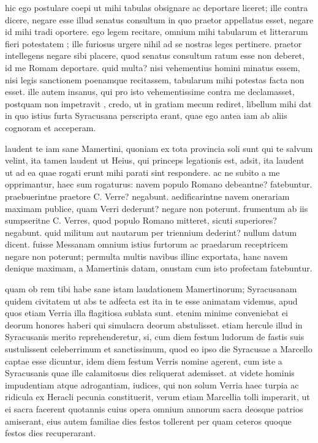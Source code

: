  hic ego postulare coepi ut mihi tabulas obsignare ac deportare liceret; ille contra dicere, negare esse illud senatus consultum in quo praetor appellatus esset, negare id mihi tradi oportere. ego legem recitare, omnium mihi tabularum et litterarum fieri potestatem ; ille furiosus urgere nihil ad se nostras leges pertinere. praetor intellegens negare sibi placere, quod senatus consultum ratum esse non deberet, id me Romam deportare. quid multa? nisi vehementius homini minatus essem, nisi legis sanctionem poenamque recitassem, tabularum mihi potestas facta non esset. ille autem insanus, qui pro isto vehementissime contra me declamasset, postquam non impetravit , credo, ut in gratiam mecum rediret, libellum mihi dat in quo istius furta Syracusana perscripta erant, quae ego antea iam ab aliis cognoram et acceperam.

 laudent te iam sane Mamertini, quoniam ex tota provincia soli sunt qui te salvum velint, ita tamen laudent ut Heius, qui princeps legationis est, adsit, ita laudent ut ad ea quae rogati erunt mihi parati sint respondere. ac ne subito a me opprimantur, haec sum rogaturus: navem populo Romano debeantne? fatebuntur. praebuerintne praetore C. Verre? negabunt. aedificarintne navem onerariam maximam publice, quam Verri dederunt? negare non poterunt. frumentum ab iis sumpseritne C. Verres, quod populo Romano mitteret, sicuti superiores? negabunt. quid militum aut nautarum per triennium dederint? nullum datum dicent. fuisse Messanam omnium istius furtorum ac praedarum receptricem negare non poterunt; permulta multis navibus illinc exportata, hanc navem denique maximam, a Mamertinis datam, onustam cum isto profectam fatebuntur.

 quam ob rem tibi habe sane istam laudationem Mamertinorum; Syracusanam quidem civitatem ut abs te adfecta est ita in te esse animatam videmus, apud quos etiam Verria illa flagitiosa sublata sunt. etenim minime conveniebat ei deorum honores haberi qui simulacra deorum abstulisset. etiam hercule illud in Syracusanis merito reprehenderetur, si, cum diem festum ludorum de fastis suis sustulissent celeberrimum et sanctissimum, quod eo ipso die Syracusae a Marcello captae esse dicuntur, idem diem festum Verris nomine agerent, cum iste a Syracusanis quae ille calamitosus dies reliquerat ademisset. at videte hominis impudentiam atque adrogantiam, iudices, qui non solum Verria haec turpia ac ridicula ex Heracli pecunia constituerit, verum etiam Marcellia tolli imperarit, ut ei sacra facerent quotannis cuius opera omnium annorum sacra deosque patrios amiserant, eius autem familiae dies festos tollerent per quam ceteros quoque festos dies recuperarant.
